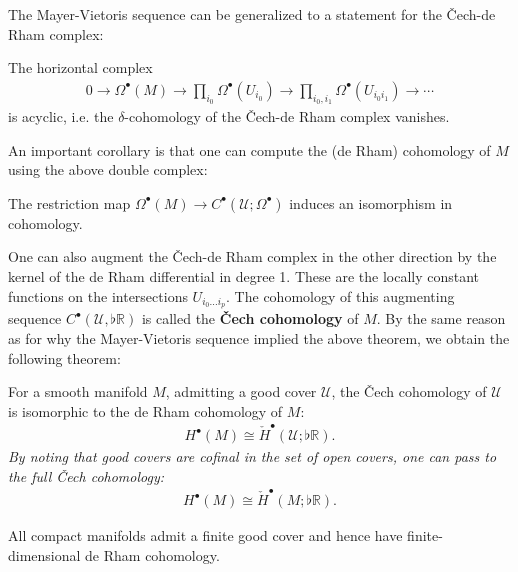 
    The Mayer-Vietoris sequence can be generalized to a statement for the \v{C}ech-de Rham complex:
    \begin{property}
        The horizontal complex
        \begin{gather}
            0\longrightarrow\Omega^\bullet(M)\longrightarrow\prod_{i_0}\Omega^\bullet(U_{i_0})\longrightarrow\prod_{i_0,i_1}\Omega^\bullet(U_{i_0i_1})\longrightarrow\cdots
        \end{gather}
        is acyclic, i.e. the $\delta$-cohomology of the \v{C}ech-de Rham complex vanishes.
    \end{property}

    An important corollary is that one can compute the (de Rham) cohomology of $M$ using the above double complex:
    \begin{theorem}
        The restriction map $\Omega^\bullet(M)\rightarrow C^\bullet(\mathcal{U};\Omega^\bullet)$ induces an isomorphism in cohomology.
    \end{theorem}
    One can also augment the \v{C}ech-de Rham complex in the other direction by the kernel of the de Rham differential in degree 1. These are the locally constant functions on the intersections $U_{i_0\ldots i_p}$. The cohomology of this augmenting sequence $C^\bullet(\mathcal{U},\flat\mathbb{R})$ is called the \textbf{\v{C}ech cohomology} of $M$. By the same reason as for why the Mayer-Vietoris sequence implied the above theorem, we obtain the following theorem:
    \begin{theorem}[\v{C}ech $=$ de Rham]
        For a smooth manifold $M$, admitting a good cover $\mathcal{U}$, the \v{C}ech cohomology of $\mathcal{U}$ is isomorphic to the de Rham cohomology of $M$:
        \begin{gather}
            H^\bullet(M)\cong\check{H}^\bullet(\mathcal{U};\flat\mathbb{R}).
        \end{gather}
        \emph{By noting that good covers are \textit{cofinal} in the set of open covers, one can pass to the full \v{C}ech cohomology:}
        \begin{gather}
            H^\bullet(M)\cong\check{H}^\bullet(M;\flat\mathbb{R}).
        \end{gather}
    \end{theorem}
    \begin{result}
        All compact manifolds admit a finite good cover and hence have finite-dimensional de Rham cohomology.
    \end{result}

